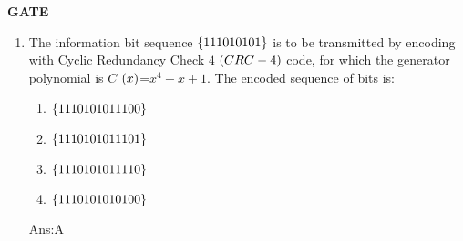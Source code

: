\documentclass[12pt,-letter paper]{article}                             \usepackage{siunitx}                                                    \newcommand{\cosec}{\,\text{cosec}\,}                                   \providecommand{\sbrak}[1]{\ensuremath{{}\left[#1\right]}}              \usepackage{setspace}                                                   \usepackage{gensymb}                                                    \usepackage{xcolor}                                                     \usepackage{caption}                                                    %
\begin{document}
\begin{center}                                                              \textbf{GATE}
\end{center}                                                            \begin{enumerate}   
	\item The information bit sequence $\left\{1 1 1 0 1 0 1 0 1 \right\}$   is to be transmitted by encoding with Cyclic Redundancy Check $4$ $\left(CRC-4\right)$ code, for which the generator polynomial is $C $ $\left(x\right)$=$ x^4+x+1$. The encoded sequence of bits \underline{\phantom{imagine}} is:                                     
	\begin{enumerate}[label={$\brak{\Alph*}$}]                             \item $\left\{1 1 1 0 1 0 1 0 1 1 1 0 0\right\}$                                \item $\left\{1 1 1 0 1 0 1 0 1 1 1 0 1\right\}$
	              \item $\left\{1 1 1 0 1 0 1 0 1 1 1 1 0\right\}$
	              \item $\left\{1 1 1 0 1 0 1 0 1 0 1 0 0 \right\}$ 
			      
	\end{enumerate}
  Ans:A
\end{enumerate}
 
\end{document}
